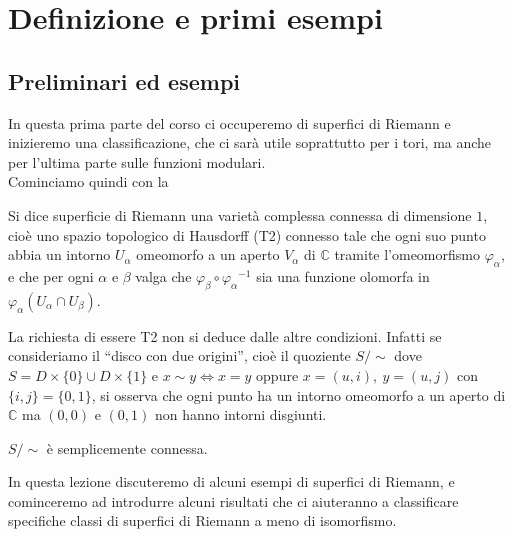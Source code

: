 \chapter{Definizione e primi esempi}

\section{Preliminari ed esempi}
In questa prima parte del corso ci occuperemo di superfici di Riemann e inizieremo una classificazione, che ci sarà utile soprattutto per i tori, ma anche per l'ultima parte sulle funzioni modulari.\\
Cominciamo quindi con la
\begin{definizione}
Si dice superficie di Riemann una varietà complessa connessa di dimensione $1$, cioè uno spazio topologico di Hausdorff (T2)
connesso tale che ogni suo punto abbia un intorno $U_\alpha$ omeomorfo a un aperto $V_\alpha$ di $\mathbb{C}$
tramite l'omeomorfismo $\varphi_\alpha$, e che per ogni $\alpha$ e $\beta$ valga che $\varphi_\beta \circ {\varphi_\alpha}^{-1}$
sia una funzione olomorfa in $\varphi_\alpha \left( U_\alpha \cap U_\beta \right)$.
\end{definizione}

\begin{osservazione}
La richiesta di essere T2 non si deduce dalle altre condizioni. Infatti se consideriamo il ``disco con due origini'',
cioè il quoziente $S/\!\!\sim$ dove $S=D\times\{0\} \cup D\times\{1\}$ e $x\sim y \Longleftrightarrow x=y$ oppure $x=(u,i),\ y=(u,j)$ con $\{i,j\}=\{0,1\}$,
si osserva che ogni punto ha un intorno omeomorfo a un aperto di $\mathbb{C}$ ma $(0,0)$ e $(0,1)$ non hanno intorni disgiunti.
\end{osservazione}
\begin{esercizio}
$S/\!\!\sim$ è semplicemente connessa.
\end{esercizio}

In questa lezione discuteremo di alcuni esempi di superfici di Riemann, e cominceremo ad introdurre alcuni risultati che ci aiuteranno a classificare specifiche classi di superfici di Riemann a meno di isomorfismo.

